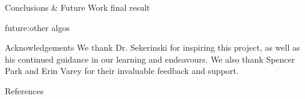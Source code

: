\documentclass[22pt]{beamer}
\begin{document}
\begin{frame}[fragile]
\begin{textblock}{7.25}
\begin{block}{Conclusions \& Future Work}
final result

future:other algos
\end{block}


\begin{block}{Acknowledgements}
We thank Dr. Sekerinski for inspiring this project, as well as his continued guidance in our learning and endeavours. We also thank Spencer Park and Erin Varey for their invaluable feedback and support. 
\end{block}

\begin{block}{References}

{\scriptsize
}
\end{block}

\end{textblock}

%
%

\end{frame}
\end{document}
